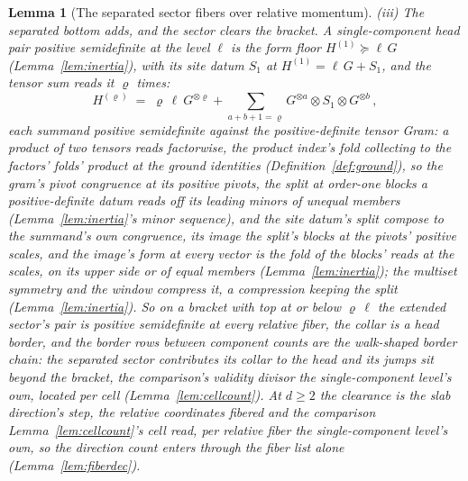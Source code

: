 \documentclass[11pt]{article}
\newtheorem{lemma}{Lemma}
\theoremstyle{definition}
\begin{document}
\begin{lemma}[The separated sector fibers over relative momentum]
\emph{(iii) The separated bottom adds, and the sector clears the
bracket.} A single-component head pair positive semidefinite at
the level $\ell$ is the form floor $H^{(1)}\succeq\ell\,G$
(Lemma~\ref{lem:inertia}), with its site datum $S_1$ at
$H^{(1)}=\ell\,G+S_1$,
and the tensor sum reads it $\varrho$ times:
\[
H^{(\varrho)}
\;=\;\varrho\,\ell\ G^{\otimes \varrho}
+\sum_{a+b+1=\varrho}G^{\otimes a}\otimes S_1
\otimes G^{\otimes b}\, ,
\]
each summand positive semidefinite against the positive-definite
tensor Gram: a product of two tensors reads factorwise, the product
index's fold collecting to the factors' folds' product at the ground
identities (Definition~\ref{def:ground}), so the gram's pivot
congruence at its positive pivots, the split at order-one blocks a
positive-definite datum reads off its leading minors of unequal
members (Lemma~\ref{lem:inertia}'s minor sequence), and the site
datum's split compose
to the summand's own congruence, its image the split's blocks at the
pivots' positive scales, and the image's form at every vector is the
fold of the blocks' reads at the scales, on its upper side or of
equal members (Lemma~\ref{lem:inertia}); the multiset symmetry and
the window compress it, a compression
keeping the split (Lemma~\ref{lem:inertia}). So on a bracket
with top at or below $\varrho\,\ell$ the extended sector's pair is
positive semidefinite at every relative fiber, the collar is a head border, and the border rows
between component counts are the walk-shaped border chain:
the separated sector contributes its collar to the head and its jumps
sit beyond the bracket, the comparison's validity divisor the
single-component level's own, located per cell
(Lemma~\ref{lem:cellcount}). At $d\ge2$ the clearance is the slab direction's step, the
relative coordinates fibered and the comparison
Lemma~\ref{lem:cellcount}'s cell read, per relative fiber the
single-component level's own, so the direction count enters
through the fiber list alone (Lemma~\ref{lem:fiberdec}).


\end{lemma}
\end{document}
